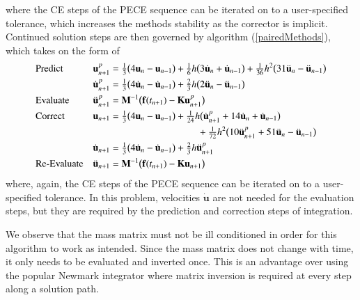 where the CE steps of the PECE sequence can be iterated on to a user-specified tolerance, which increases the methods stability as the corrector is implicit.  Continued solution steps are then governed by algorithm (\ref{pairedMethods}), which takes on the form of
\begin{subequations}
    \notag
    \begin{align}
    \mbox{} & \text{Predict} &
    \mathbf{u}_{n+1}^p & = \tfrac{1}{3} \bigl(
    4 \mathbf{u}_n - \mathbf{u}_{n-1} \bigr) + 
    \tfrac{1}{6} h \bigl( 3 \dot{\mathbf{u}}_n + 
    \dot{\mathbf{u}}_{n-1} \bigr) + 
    \tfrac{1}{36} h^2 \bigl( 31 \ddot{\mathbf{u}}_n - 
    \ddot{\mathbf{u}}_{n-1} \bigr) \\
    \mbox{} & &
    \dot{\mathbf{u}}_{n+1}^p & = \tfrac{1}{3} 
    \bigl( 4 \dot{\mathbf{u}}_n - \dot{\mathbf{u}}_{n-1} \bigr) + 
    \tfrac{2}{3} h \bigl( 2 \ddot{\mathbf{u}}_n - \ddot{\mathbf{u}}_{n-1} \bigr) \\
    \mbox{} & \text{Evaluate} &
    \ddot{\mathbf{u}}^p_{n+1} & = \mathbf{M}^{-1} \bigl( \mathbf{f}(t_{n+1} ) - 
    \mathbf{K} \mathbf{u}_{n+1}^p \bigr) \\
    \mbox{} & \text{Correct} & 
    \mathbf{u}_{n+1} & = \tfrac{1}{3} \bigl(
    4  \mathbf{u}_n - \mathbf{u}_{n-1} \bigr) +
    \tfrac{1}{24} h \bigl( \dot{\mathbf{u}}^p_{n+1} +
    14 \dot{\mathbf{u}}_n + \dot{\mathbf{u}}_{n-1} \bigr)  \\
    \mbox{} & & & \hspace{3.175cm} +
    \tfrac{1}{72} h^2 \bigl( 10 \ddot{\mathbf{u}}^p_{n+1} + 
    51 \ddot{\mathbf{u}}_n - \ddot{\mathbf{u}}_{n-1} \bigr) \\ 
    \mbox{} & &
    \dot{\mathbf{u}}_{n+1} & = \tfrac{1}{3} 
    \bigl( 4 \dot{\mathbf{u}}_n - \dot{\mathbf{u}}_{n-1} \bigr) + 
    \tfrac{2}{3} h \ddot{\mathbf{u}}^p_{n+1}  \\
    \mbox{} & \text{Re-Evaluate} & 
    \ddot{\mathbf{u}}_{n+1} & = \mathbf{M}^{-1} \bigl( \mathbf{f}(t_{n+1} ) - 
    \mathbf{K} \mathbf{u}_{n+1} \bigr) 
    \end{align}
\end{subequations}
where, again, the CE steps of the PECE sequence can be iterated on to a user-specified tolerance.  In this problem, velocities $\dot{\mathbf{u}}$ are not needed for the evaluation steps, but they are required by the prediction and correction steps of integration.

We observe that the mass matrix must not be ill conditioned in order for this algorithm to work as intended.  Since the mass matrix does not change with time, it only needs to be evaluated and inverted once.  This is an advantage over using the popular Newmark \cite{Newmark59} integrator where matrix inversion is required at every step along a solution path.

